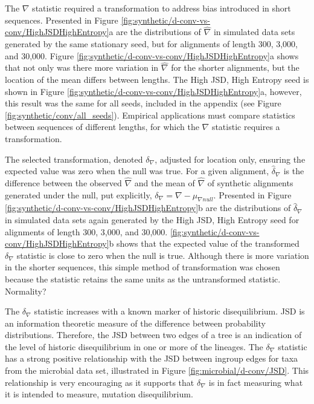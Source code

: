 

The $\nabla$ statistic required a transformation to address bias introduced in short sequences. Presented in Figure \ref{fig:synthetic/d-conv-vs-conv/HighJSDHighEntropy}a are the distributions of $\hat \nabla$ in simulated data sets generated by the same stationary seed, but for alignments of length 300, 3,000, and 30,000. Figure \ref{fig:synthetic/d-conv-vs-conv/HighJSDHighEntropy}a shows that not only was there more variation in $\hat \nabla$ for the shorter alignments, but the location of the mean differs between lengths. The High JSD, High Entropy seed is shown in Figure \ref{fig:synthetic/d-conv-vs-conv/HighJSDHighEntropy}a, however, this result was the same for all seeds, included in the appendix (see Figure \ref{fig:synthetic/conv/all_seeds}). Empirical applications must compare statistics between sequences of different lengths, for which the $\nabla$ statistic requires a transformation. 



The selected transformation, denoted $\delta_\nabla$, adjusted for location only, ensuring the expected value was zero when the null was true. For a given alignment, $\hat \delta_\nabla$ is the difference between the observed $\hat \nabla$ and the mean of  $\hat \nabla$ of synthetic alignments generated under the null, put explicitly, $\delta_\nabla =  \nabla - \mu_{\nabla{null}}.$ Presented in Figure \ref{fig:synthetic/d-conv-vs-conv/HighJSDHighEntropy}b are the distributions of $\hat \delta_\nabla$ in simulated data sets again generated by the High JSD, High Entropy seed for alignments of length 300, 3,000, and 30,000. \ref{fig:synthetic/d-conv-vs-conv/HighJSDHighEntropy}b shows that the expected value of the transformed $\delta_\nabla$ statistic is close to zero when the null is true. Although there is more variation in the shorter sequences, this simple method of transformation was chosen because the statistic retains the same units as the untransformed statistic. Normality?

The $\delta_\nabla$ statistic increases with a known marker of historic disequilibrium. JSD is an information theoretic measure of the difference between probability distributions. Therefore, the JSD between two edges of a tree is an indication of the level of historic disequilibrium in one or more of the lineages. The $\delta_\nabla$ statistic has a strong positive relationship with the JSD between ingroup edges for taxa from the microbial data set, illustrated in Figure \ref{fig:microbial/d-conv/JSD}. This relationship is very encouraging as it supports that $\delta_\nabla$ is in fact measuring what it is intended to measure, mutation disequilibrium. 

